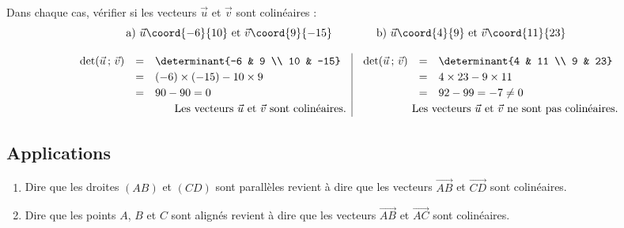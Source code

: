 \documentclass{poly}
\begin{document}
\begin{methode}
	Dans chaque cas, vérifier si les vecteurs $\vec{u}$ et $\vec{v}$ sont colinéaires :
	\[
		\text{a)}\ \vec{u}\coord{-6}{10} \text{ et } \vec{v}\coord{9}{-15}
		\qquad\qquad
		\text{b)}\ \vec{u}\coord{4}{9} \text{ et } \vec{v}\coord{11}{23}
	\]

	\begin{correction}
		$$
			\begin{array}{r|r}
				\def\arraystretch{1.2}
				\begin{array}{rcl}
					\det(\vec{u}\,;\,\vec{v}) & = & \determinant{-6             & 9 \\ 10 & -15} \\
					                          & = & (-6)\times(-15) - 10\times9     \\
					                          & = & 90 - 90 = 0
				\end{array} &
				\def\arraystretch{1.2}
				\begin{array}{rcl}
					\det(\vec{u}\,;\,\vec{v}) & = & \determinant{4        & 11 \\ 9 & 23} \\
					                          & = & 4\times23 - 9\times11      \\
					                          & = & 92 - 99 = -7 \neq 0
				\end{array}             \\
				\text{Les vecteurs } \vec{u} \text{ et } \vec{v} \text{ sont colinéaires.}      &
				\text{Les vecteurs } \vec{u} \text{ et } \vec{v} \text{ ne sont pas colinéaires.}
			\end{array}
		$$
	\end{correction}
\end{methode}

\subsection{Applications}

\begin{prop}
	\begin{enumerate}
		\item Dire que les droites $(AB)$ et $(CD)$ sont parallèles revient à dire que les vecteurs $\vec{AB}$ et $\vec{CD}$ sont colinéaires.
		\item Dire que les points $A$, $B$ et $C$ sont alignés revient à dire que les vecteurs $\vec{AB}$ et $\vec{AC}$ sont colinéaires.
	\end{enumerate}
\end{prop}
\end{document}
